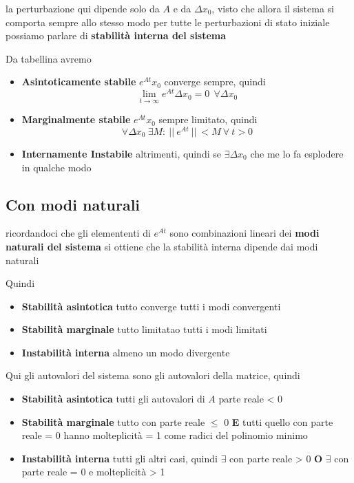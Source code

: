 \documentclass[11pt]{article}
\begin{document}
la perturbazione qui dipende solo da \(A\) e da \(\Delta x_0\), visto che allora il
sistema si comporta sempre allo stesso modo per tutte le perturbazioni di stato
iniziale possiamo parlare di \textbf{stabilità interna del sistema}

Da tabellina avremo

\begin{itemize}
\item \textbf{Asintoticamente stabile} \iff \(e^{At}x_0\) converge sempre, quindi
\[\lim_{t \to \infty} e^{At} \Delta x_0 = 0\ \ \forall \Delta x_0\]
\item \textbf{Marginalmente stabile} \iff \(e^{At}x_0\) sempre limitato, quindi
\[ \forall \Delta x_0\ \exists M :\
	  \lvert \lvert\ e^{At}\ \rvert \rvert\ < M\ \forall\ t > 0 \]
\item \textbf{Internamente Instabile} altrimenti, quindi se \(\exists \Delta x_0\)
che me lo fa esplodere in qualche modo
\end{itemize}

\subsection{Con modi naturali}
\label{sec:org3ddfb51}

ricordandoci che gli elemententi di \(e^{At}\) sono combinazioni lineari dei \textbf{modi
naturali del sistema} si ottiene che la stabilità interna dipende dai modi naturali

Quindi
\begin{itemize}
\item \textbf{Stabilità asintotica} \iff tutto converge \iff tutti i modi convergenti
\item \textbf{Stabilità marginale} \iff tutto limitatao \iff tutti i modi limitati
\item \textbf{Instabilità interna} \iff almeno un modo divergente
\end{itemize}

Qui gli autovalori del sistema sono gli autovalori della matrice, quindi	  
\begin{itemize}
\item \textbf{Stabilità asintotica} \iff tutti gli autovalori di \(A\) parte reale < 0
\item \textbf{Stabilità marginale} \iff tutto con parte reale \(\le\) 0 \textbf{E} tutti quello
con parte reale = 0 hanno molteplicità = 1 come radici del polinomio minimo
\item \textbf{Instabilità interna} \iff tutti gli altri casi, quindi \(\exists\) con
parte reale > 0 \textbf{O} \(\exists\) con parte reale = 0 e molteplicità > 1
\end{itemize}
\end{document}
